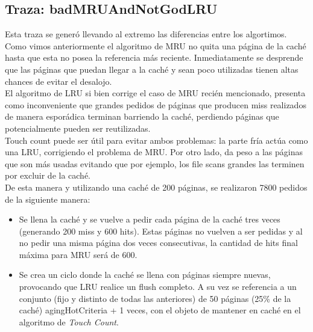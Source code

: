 \documentclass[11pt, a4paper, spanish]{article}
\begin{document}
\subsection{Traza: badMRUAndNotGodLRU}

Esta traza se gener\'o llevando al extremo las diferencias entre los algortimos.\\

Como vimos anteriormente el algoritmo de MRU no quita una p\'agina de la cach\'e hasta que esta no posea la referencia m\'as reciente. 
Inmediatamente se desprende que las p\'aginas que puedan llegar a la cach\'e y sean poco utilizadas tienen altas chances de evitar el desalojo.\\

El algoritmo de LRU si bien corrige el caso de MRU reci\'en mencionado, presenta como inconveniente que grandes pedidos de p\'aginas que producen
miss realizados de manera espor\'adica terminan barriendo la cach\'e, perdiendo p\'aginas que potencialmente pueden ser reutilizadas.\\

Touch count puede ser \'util para evitar ambos problemas: la parte fr\'ia act\'ua como una LRU, corrigiendo el problema de MRU. Por otro lado, 
da peso a las p\'aginas que son m\'as usadas evitando que por ejemplo, los file scans grandes las terminen por excluir de la cach\'e.\\

De esta manera y utilizando una cach\'e de 200 p\'aginas, se realizaron 7800 pedidos de la siguiente manera:\\

\begin{itemize}
    
	\item{Se llena la cach\'e y se vuelve a pedir cada p\'agina de la cach\'e tres veces (generando 200 miss y 600 hits).
Estas p\'aginas no vuelven a ser pedidas y al no pedir una misma p\'agina dos veces consecutivas, la cantidad de hits final m\'axima para MRU
ser\'a de 600.}\\

    \item{Se crea un ciclo donde la cach\'e se llena con p\'aginas siempre nuevas, provocando que LRU realice un flush completo. 
A su vez se referencia a un conjunto (fijo y distinto de todas las anteriores) de 50 p\'aginas (25\% de la cach\'e) agingHotCriteria + 1 veces, 
con el objeto de mantener en cach\'e en el algoritmo de \textit{Touch Count}.}\\ 

\end{itemize}
\end{document}
